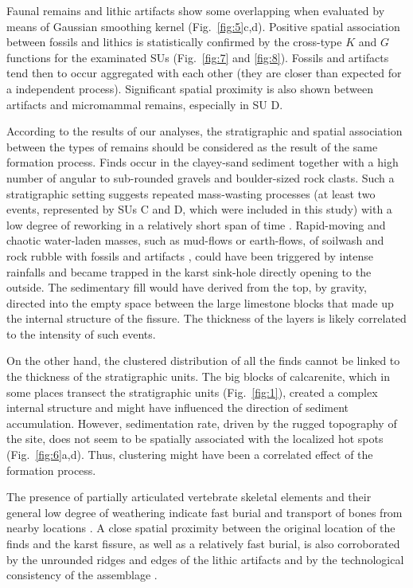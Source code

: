 \documentclass[5p,authoryear]{elsarticle} %
\begin{document}
Faunal remains and lithic artifacts show some overlapping when evaluated by means of Gaussian smoothing kernel (Fig.~\ref{fig:5}c,d). Positive spatial association between fossils and lithics is statistically confirmed by the cross-type $K$  and $G$ functions for the examinated SUs (Fig.~\ref{fig:7} and \ref{fig:8}). Fossils and artifacts tend then to occur aggregated with each other (they are closer than expected for a independent process). Significant spatial proximity is also shown between artifacts and micromammal remains, especially in SU D.

According to the results of our analyses, the stratigraphic and spatial association between the types of remains should be considered as the result of the same formation process. Finds occur in the clayey-sand sediment together with a high number of angular to sub-rounded gravels and boulder-sized rock clasts. Such a stratigraphic setting suggests repeated mass-wasting processes (at least two events, represented by SUs C and D, which were included in this study) with a low degree of reworking in a relatively short span of time \citep{Arzarello2012}. Rapid-moving and chaotic water-laden masses, such as mud-flows or earth-flows, of soilwash and rock rubble with fossils and artifacts \citep[p.~46]{Butzer1982}, could have been triggered by intense rainfalls and became trapped in the karst sink-hole directly opening to the outside. The sedimentary fill would have derived from the top, by gravity, directed into the empty space between the large limestone blocks that made up the internal structure of the fissure. The thickness of the layers is likely correlated to the intensity of such events.

On the other hand, the clustered distribution of all the finds cannot be linked to the thickness of the stratigraphic units. The big blocks of calcarenite, which in some places transect the stratigraphic units (Fig.~\ref{fig:1}), created a complex internal structure and might have influenced the direction of sediment accumulation. However, sedimentation rate, driven by the rugged topography of the site, does not seem to be spatially associated with the localized hot spots (Fig.~\ref{fig:6}a,d). Thus, clustering might have been a correlated effect of the formation process.

The presence of partially articulated vertebrate skeletal elements and their general low degree of weathering indicate fast burial and transport of bones from nearby locations \citep{Bagnus2011}. A close spatial proximity between the original location of the finds and the karst fissure, as well as a relatively fast burial, is also corroborated by the unrounded ridges and edges of the lithic artifacts and by the technological consistency of the assemblage \citep{Arzarello2015}.
\end{document}
